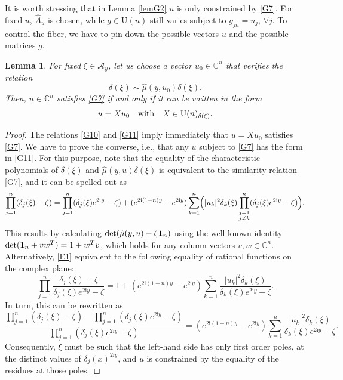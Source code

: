 \documentclass[a4paper,11pt,reqno]{amsart}
\newtheorem{lem}[thm]{Lemma}
\theoremstyle{definition}
\numberwithin{equation}{section}
\newcommand{\be}{\begin{equation}}
\newcommand{\ee}{\end{equation}}
\def\cA{{\mathcal A}}                       %
\def\ri{{\mathrm{i}}}                       %
\def\1{{\mbox{\boldmath $1$}}}              %
\def\bC{{\mathbb C}}                        %
\def\U{\mathrm{U}}                          %
\begin{document}
It is worth stressing that  in Lemma \ref{lemG2}  $u$ is only constrained by \eqref{G7}.
For fixed $u$, $\hat A_u$ is chosen, while $g\in \U(n)$ still varies subject to $g_{jn}=u_j$, $\forall j$.
To control the fiber, we have to pin down  the possible vectors $u$  and the possible matrices $g$.

\begin{lem}\label{lemG3}
For fixed $\xi \in \cA_y$,  let us choose a vector
$u_0\in \bC^n$ that verifies the relation
\be
\delta(\xi) \sim \hat \mu(y,u_0) \delta(\xi).
\label{G10}\ee
Then,  $u\in \bC^n$ satisfies \eqref{G7} if and only if it can be written in the form
\be
u = X u_0
\quad \hbox{with}\quad X \in \U(n)_{\delta(\xi)}.
\label{G11}\ee
\end{lem}
\begin{proof}
The relations \eqref{G10} and \eqref{G11}  imply immediately that $u=X u_0$ satisfies \eqref{G7}.
 We have to prove the converse, i.e., that any $u$ subject to \eqref{G7} has the form
in \eqref{G11}. For this purpose, note that the equality of the characteristic polynomials of $\delta(\xi)$
and $\hat \mu(y,u) \delta(\xi)$ is equivalent to the similarity relation \eqref{G7}, and it
 can be  spelled out as
\be
\prod_{j=1}^n (\delta_j(\xi) -\zeta )=\prod_{j=1}^n (\delta_j(\xi) e^{2\ri y}- \zeta)
+ (e^{2\ri(1-n) y}-e^{2\ri y}) \sum_{k=1}^n \Bigl(\vert u_k \vert^2 \delta_{k}(\xi)
\prod_{\substack{j=1\\j \neq k}}^n (\delta_j (\xi)e^{2\ri  y} -\zeta)\Bigr).
\label{E1}\ee
This results by calculating $\det(\hat \mu(y,u) - \zeta \1_n)$
 using the well known identity
 $\det(\1_n + v w^T )= 1 + w^T v$, which holds for any column vectors $v, w \in \bC^n$.
Alternatively, \eqref{E1} equivalent to the following equality of rational functions on the complex plane:
\be
\prod_{j=1}^n \frac{\delta_j(\xi) -\zeta }{\delta_j(\xi)e^{2\ri  y} -\zeta}=
1 +  (e^{2\ri(1-n) y}-e^{2\ri y}) \sum_{k=1}^n \frac{\vert u_k \vert^2 \delta_{k}(\xi)}{\delta_k (\xi)e^{2\ri  y} -\zeta}.
\label{E2}\ee
In turn, this can be rewritten as
\be
\frac{\prod_{j=1}^n (\delta_j(\xi) -\zeta) - \prod_{j=1}^n (\delta_j(\xi)e^{2\ri  y} -\zeta)}{ \prod_{j=1}^n (\delta_j(\xi)e^{2\ri  y} -\zeta)}
= (e^{2\ri(1-n) y}-e^{2\ri y}) \sum_{k=1}^n \frac{\vert u_k \vert^2 \delta_{k}(\xi)}{\delta_k (\xi)e^{2\ri  y} -\zeta}.
\label{E3}\ee
Consequently, $\xi$ must be such that the left-hand side has only first order poles,   at the distinct values of $\delta_j(x)^{2\ri y}$,
and $u$ is constrained by the equality of the residues at those poles.


\end{proof}
\end{document}
